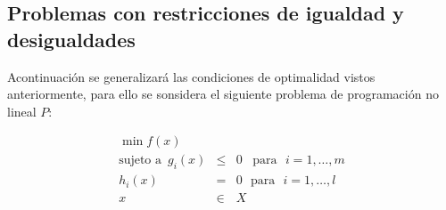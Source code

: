 \subsection{Problemas con restricciones de igualdad y desigualdades}

Acontinuaci\'on se generalizar\'a  las condiciones de optimalidad vistos anteriormente, para ello se sonsidera el siguiente problema de 
programaci\'on no lineal $P:$

\begin{eqnarray*}
   \min f(x) &  \,\, &  \\
   \mbox{sujeto a }\, g_i(x) & \leqslant & 0\,\,\, \mbox{ para }\, \, i=1, \ldots ,m\\
   h_i(x) & = & 0\,\, \mbox{ para }\, \, i=1, \ldots ,l\\
   x & \in & X 
\end{eqnarray*}


